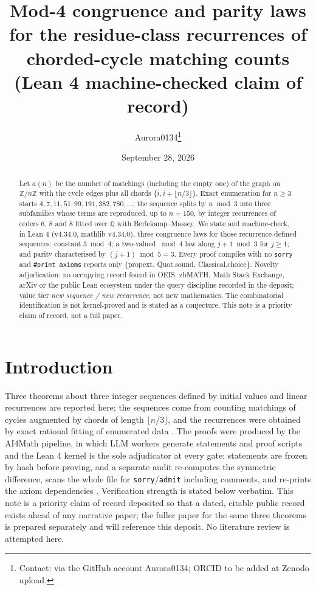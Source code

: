 \documentclass[11pt]{article}
\title{Mod-4 congruence and parity laws for the residue-class recurrences of
chorded-cycle matching counts\\ (Lean 4 machine-checked claim of record)}
\author{Aurora0134\thanks{Contact: via the GitHub account Aurora0134; ORCID to
be added at Zenodo upload.}}
\date{September 28, 2026}
\theoremstyle{definition}
\begin{document}
\maketitle

\begin{abstract}
Let $a(n)$ be the number of matchings (including the empty one) of the graph on
$\mathbb{Z}/n\mathbb{Z}$ with the cycle edges plus all chords
$\{i,i+\lfloor n/3\rfloor\}$. Exact enumeration for $n\ge 3$ starts
$4,7,11,51,99,191,382,780,\dots$; the sequence splits by $n\bmod 3$ into three
subfamilies whose terms are reproduced, up to $n=150$, by integer recurrences of
orders $6$, $8$ and $8$ fitted over $\mathbb{Q}$ with Berlekamp--Massey. We state
and machine-check, in Lean 4 (v4.34.0, mathlib v4.34.0), three congruence laws
for those recurrence-defined sequences: constant $3\bmod 4$; a two-valued
$\bmod 4$ law along $j+1\bmod 3$ for $j\ge 1$; and parity characterised by
$(j+1)\bmod 5=3$. Every proof compiles with no \texttt{sorry} and
\texttt{\#print axioms} reports only \{propext, Quot.sound, Classical.choice\}.
Novelty adjudication: no occupying record found in OEIS, zbMATH, Math Stack
Exchange, arXiv or the public Lean ecosystem under the query discipline recorded
in the deposit; value tier \emph{new sequence / new recurrence}, not new
mathematics. The combinatorial identification is not kernel-proved and is stated
as a conjecture. This note is a priority claim of record, not a full paper.
\end{abstract}

\section{Introduction}

Three theorems about three integer sequences defined by initial values and
linear recurrences are reported here; the sequences come from counting matchings
of cycles augmented by chords of length $\lfloor n/3\rfloor$, and the recurrences
were obtained by exact rational fitting of enumerated data
\cite{massey,godsil-gutman}. The proofs were produced by the AI4Math pipeline, in
which LLM workers generate statements and proof scripts and the Lean 4 kernel is
the sole adjudicator at every gate: statements are frozen by hash before
proving, and a separate audit re-computes the symmetric difference, scans the
whole file for \texttt{sorry}/\texttt{admit} including comments, and re-prints
the axiom dependencies \cite{lean4,mathlib}. Verification strength is stated
below verbatim. This note is a priority claim of record deposited so that a
dated, citable public record exists ahead of any narrative paper; the fuller
paper for the same three theorems is prepared separately and will reference
this deposit. No literature review is attempted here.
\end{document}
